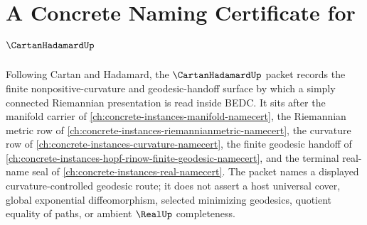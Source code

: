 \chapter{A Concrete Naming Certificate for $\CartanHadamardUp$}
\label{ch:concrete-instances-cartan-hadamard-namecert}

Following Cartan and Hadamard, the $\CartanHadamardUp$ packet records the finite nonpositive-curvature and geodesic-handoff surface by which a simply connected Riemannian presentation is read inside BEDC. It sits after the manifold carrier of \autoref{ch:concrete-instances-manifold-namecert}, the Riemannian metric row of \autoref{ch:concrete-instances-riemannianmetric-namecert}, the curvature row of \autoref{ch:concrete-instances-curvature-namecert}, the finite geodesic handoff of \autoref{ch:concrete-instances-hopf-rinow-finite-geodesic-namecert}, and the terminal real-name seal of \autoref{ch:concrete-instances-real-namecert}. The packet names a displayed curvature-controlled geodesic route; it does not assert a host universal cover, global exponential diffeomorphism, selected minimizing geodesics, quotient equality of paths, or ambient $\RealUp$ completeness.

